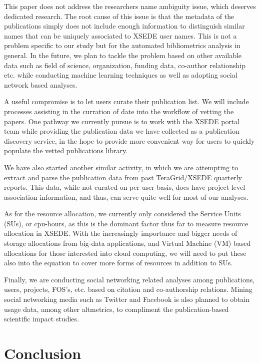 \documentclass{sig-alternate}
\begin{document}
This paper does not address the researchers name ambiguity issue, which deserves dedicated research. The root cause of this issue is that the metadata of the publications simply does not include enough information to distinguish similar names that can be uniquely associated to XSEDE user names. This is not a problem specific to our study but for the automated bibliometrics analysis in general. In the future, we plan to tackle the problem based on other available data such as field of science, organization, funding data, co-author relationship etc. while conducting machine learning techniques as well as adopting social network based analyses.

A useful compromise is to let users curate their publication list.  We will include processes assisting in the curration of date into the workflow of vetting the papers. One pathway we currently pursue is to work with the XSEDE portal team while providing the publication data we have collected as a publication discovery service, in the hope to provide more convenient way for users to quickly populate the vetted publications library.

We have also started another similar activity, in which we are attempting to extract and parse the publication data from past TeraGrid/XSEDE quarterly reports. This data, while not curated on per user basis, does have project level association information, and thus, can serve quite well for most of our analyses.

As for the resource allocation, we currently only considered the Service Units (SUs), or cpu-hours, as this is the dominant factor thus far to measure resource allocation in XSEDE. With the increasingly importance and bigger needs of storage allocations from big-data applications, and Virtual Machine (VM) based allocations for those interested into cloud computing, we will need to put these also into the equation to cover more forms of resources in addition to SUs.

Finally, we are conducting social networking related analyses among publications, users, projects, FOS's, etc. based on citation and co-authorship relations. Mining social networking media such as Twitter and Facebook is also planned to obtain usage data, among other altmetrics, to compliment the publication-based scientific impact studies.

\section{Conclusion} \label{S:conclusion}
\end{document}
